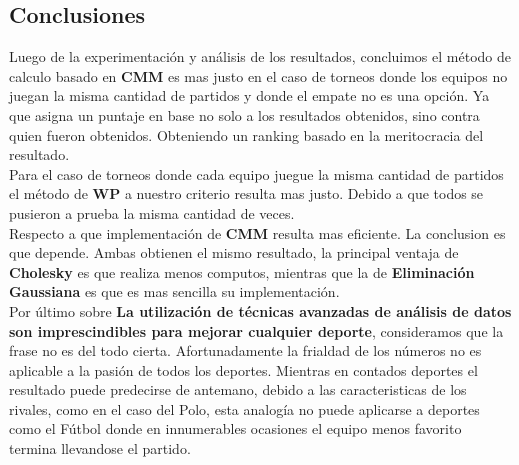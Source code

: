 \subsection{Conclusiones}


Luego de la experimentación y análisis de los resultados, concluimos el método de calculo basado en \textbf{CMM} es mas justo en el caso de torneos donde los equipos no juegan la misma cantidad de partidos y donde el empate no es una opción. Ya que asigna un puntaje en base no solo a los resultados obtenidos, sino contra quien fueron obtenidos. Obteniendo un ranking basado en la meritocracia del resultado. \\

Para el caso de torneos donde cada equipo juegue la misma cantidad de partidos el método de \textbf{WP} a nuestro criterio resulta mas justo. Debido a que todos se pusieron a prueba la misma cantidad de veces. \\

Respecto a que implementación de \textbf{CMM} resulta mas eficiente. La conclusion es que depende. Ambas obtienen el mismo resultado, la principal ventaja de \textbf{Cholesky} es que realiza menos computos, mientras que la de \textbf{Eliminación Gaussiana} es que es mas sencilla su implementación. \\

Por último sobre \textbf{La utilización de técnicas avanzadas de análisis de datos son imprescindibles para mejorar cualquier deporte}, consideramos que la frase no es del todo cierta. Afortunadamente la frialdad de los números no es aplicable a la pasión de todos los deportes. Mientras en contados deportes el resultado puede predecirse de antemano, debido a las caracteristicas de los rivales, como en el caso del Polo, esta analogía no puede aplicarse a deportes como el Fútbol donde en innumerables ocasiones el equipo menos favorito termina llevandose el partido.
